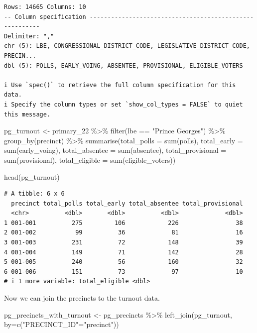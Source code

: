 \documentclass[
  letterpaper,
  DIV=11,
  numbers=noendperiod]{scrreprt}
\newenvironment{Shaded}{\begin{snugshade}}{\end{snugshade}}
\newcommand{\AttributeTok}[1]{\textcolor[rgb]{0.40,0.45,0.13}{#1}}
\newcommand{\FunctionTok}[1]{\textcolor[rgb]{0.28,0.35,0.67}{#1}}
\newcommand{\NormalTok}[1]{\textcolor[rgb]{0.00,0.23,0.31}{#1}}
\newcommand{\OtherTok}[1]{\textcolor[rgb]{0.00,0.23,0.31}{#1}}
\newcommand{\SpecialCharTok}[1]{\textcolor[rgb]{0.37,0.37,0.37}{#1}}
\newcommand{\StringTok}[1]{\textcolor[rgb]{0.13,0.47,0.30}{#1}}
\begin{document}
\begin{verbatim}
Rows: 14665 Columns: 10
-- Column specification --------------------------------------------------------
Delimiter: ","
chr (5): LBE, CONGRESSIONAL_DISTRICT_CODE, LEGISLATIVE_DISTRICT_CODE, PRECIN...
dbl (5): POLLS, EARLY_VOING, ABSENTEE, PROVISIONAL, ELIGIBLE_VOTERS

i Use `spec()` to retrieve the full column specification for this data.
i Specify the column types or set `show_col_types = FALSE` to quiet this message.
\end{verbatim}

\begin{Shaded}
\begin{Highlighting}[]
\NormalTok{pg\_turnout }\OtherTok{\textless{}{-}}\NormalTok{ primary\_22 }\SpecialCharTok{\%\textgreater{}\%} 
  \FunctionTok{filter}\NormalTok{(lbe }\SpecialCharTok{==} \StringTok{"Prince George\textquotesingle{}s"}\NormalTok{) }\SpecialCharTok{\%\textgreater{}\%} 
  \FunctionTok{group\_by}\NormalTok{(precinct) }\SpecialCharTok{\%\textgreater{}\%} 
  \FunctionTok{summarise}\NormalTok{(}\AttributeTok{total\_polls =} \FunctionTok{sum}\NormalTok{(polls), }\AttributeTok{total\_early =} \FunctionTok{sum}\NormalTok{(early\_voing), }\AttributeTok{total\_absentee =} \FunctionTok{sum}\NormalTok{(absentee), }\AttributeTok{total\_provisional =} \FunctionTok{sum}\NormalTok{(provisional), }\AttributeTok{total\_eligible =} \FunctionTok{sum}\NormalTok{(eligible\_voters))}

\FunctionTok{head}\NormalTok{(pg\_turnout)}
\end{Highlighting}
\end{Shaded}

\begin{verbatim}
# A tibble: 6 x 6
  precinct total_polls total_early total_absentee total_provisional
  <chr>          <dbl>       <dbl>          <dbl>             <dbl>
1 001-001          275         106            226                38
2 001-002           99          36             81                16
3 001-003          231          72            148                39
4 001-004          149          71            142                28
5 001-005          240          56            160                32
6 001-006          151          73             97                10
# i 1 more variable: total_eligible <dbl>
\end{verbatim}

Now we can join the precincts to the turnout data.

\begin{Shaded}
\begin{Highlighting}[]
\NormalTok{pg\_precincts\_with\_turnout }\OtherTok{\textless{}{-}}\NormalTok{ pg\_precincts }\SpecialCharTok{\%\textgreater{}\%} \FunctionTok{left\_join}\NormalTok{(pg\_turnout, }\AttributeTok{by=}\FunctionTok{c}\NormalTok{(}\StringTok{"PRECINCT\_ID"}\OtherTok{=}\StringTok{"precinct"}\NormalTok{))}
\end{Highlighting}
\end{Shaded}
\end{document}
